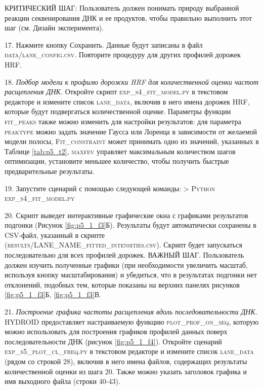   КРИТИЧЕСКИЙ ШАГ: Пользователь должен понимать природу выбранной реакции секвенирования ДНК и ее продуктов, чтобы правильно выполнить этот шаг (см. Дизайн эксперимента).

    17. Нажмите кнопку Сохранить. Данные будут записаны в файл \textsc{data/lane\_config.csv}. Повторите процедуру для других профилей дорожек HRF.


    
    
    
    18.     \emph{Подбор модели к профилю дорожки HRF для количественной оценки частот расщепления ДНК.} Откройте скрипт \textsc{exp\_s4\_fit\_model.py} в текстовом редакторе и измените список \textsc{lane\_data}, включив в него имена дорожек HRF, которые будут подвергаться количественной оценке. Параметры функции \textsc{fit\_peaks} также можно изменить для настройки результатов: для параметра \textsc{peaktype} можно задать значение Гаусса или Лоренца в зависимости от желаемой модели полосы, \textsc{Fit\_constraint} может принимать одно из значений, указанных в Таблице \ref{tab:p5_t2}, \textsc{maxfev} управляет максимальным количеством шагов оптимизации, установите меньшее количество, чтобы получить быстрые предварительные результаты.

    19. Запустите сценарий с помощью следующей команды:
    \textsc{> Python exp\_s4\_fit\_model.py}

    20. Скрипт выведет интерактивные графические окна с графиками результатов подгонки (Рисунок \ref{fig:p5_1_f3}Б). Результаты будут автоматически сохранены в CSV-файл, указанный в скрипте (\textsc{results/LANE\_NAME\_fitted\_intensities.csv}). Скрипт будет запускаться последовательно для всех профилей дорожек.
    ВАЖНЫЙ ШАГ. Пользователь должен изучить полученные графики (при необходимости увеличить масштаб, используя кнопку масштабирования) и убедиться, что в результатах подгонки нет отклонений, подобных тем, которые показаны на верхних панелях рисунков \ref{fig:p5_1_f3}Б, \ref{fig:p5_1_f3}В. 
    


    21.     \emph{Построение графика частоты расщепления вдоль последовательности ДНК.}
        HYDROID предоставляет настраиваемую функцию \textsc{plot\_prof\_on\_seq}, которую можно использовать для построения графиков профилей данных поверх последовательности ДНК (рисунок \ref{fig:p5_1_f4}). Откройте сценарий \textsc{exp\_s5\_plot\_cl\_freq.py} в текстовом редакторе и измените список \textsc{lane\_data} (рядом со строкой 28), включив в него имена файлов, содержащих результаты количественной оценки из шага 20. Также можно указать заголовок графика и имя выходного файла (строки 40-43).

